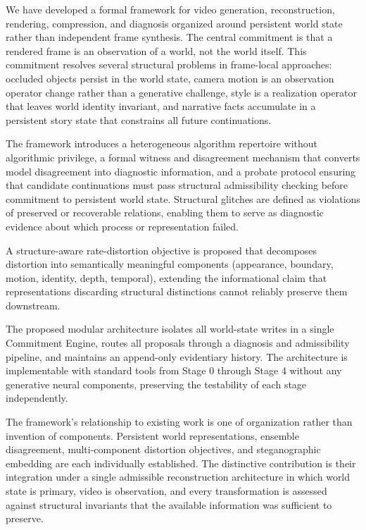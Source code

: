 \documentclass[12pt,a4paper]{article}
\theoremstyle{plain}
\theoremstyle{definition}
\theoremstyle{remark}
\begin{document}
We have developed a formal framework for video generation, reconstruction, rendering, compression, and diagnosis organized around persistent world state rather than independent frame synthesis. The central commitment is that a rendered frame is an observation of a world, not the world itself. This commitment resolves several structural problems in frame-local approaches: occluded objects persist in the world state, camera motion is an observation operator change rather than a generative challenge, style is a realization operator that leaves world identity invariant, and narrative facts accumulate in a persistent story state that constrains all future continuations.

The framework introduces a heterogeneous algorithm repertoire without algorithmic privilege, a formal witness and disagreement mechanism that converts model disagreement into diagnostic information, and a probate protocol ensuring that candidate continuations must pass structural admissibility checking before commitment to persistent world state. Structural glitches are defined as violations of preserved or recoverable relations, enabling them to serve as diagnostic evidence about which process or representation failed.

A structure-aware rate-distortion objective is proposed that decomposes distortion into semantically meaningful components (appearance, boundary, motion, identity, depth, temporal), extending the informational claim that representations discarding structural distinctions cannot reliably preserve them downstream.

The proposed modular architecture isolates all world-state writes in a single Commitment Engine, routes all proposals through a diagnosis and admissibility pipeline, and maintains an append-only evidentiary history. The architecture is implementable with standard tools from Stage 0 through Stage 4 without any generative neural components, preserving the testability of each stage independently.

The framework's relationship to existing work is one of organization rather than invention of components. Persistent world representations, ensemble disagreement, multi-component distortion objectives, and steganographic embedding are each individually established. The distinctive contribution is their integration under a single admissible reconstruction architecture in which world state is primary, video is observation, and every transformation is assessed against structural invariants that the available information was sufficient to preserve.
\end{document}
